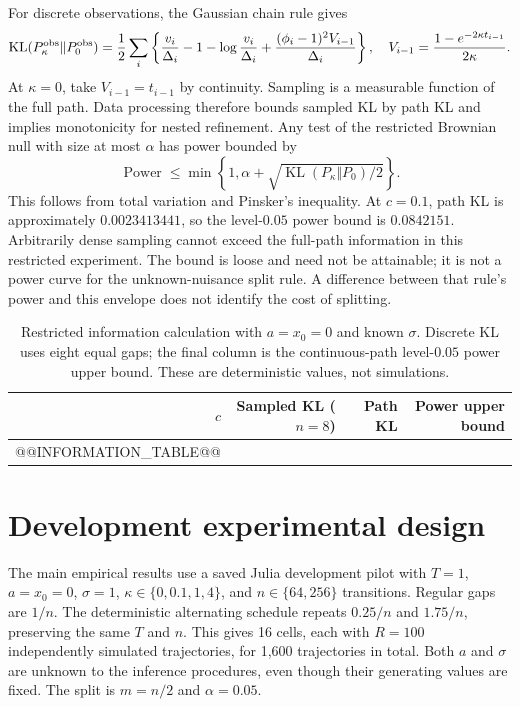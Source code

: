 \documentclass[11pt]{article}
\newcommand{\KL}{\operatorname{KL}}
\begin{document}
For discrete observations, the Gaussian chain rule gives
\begin{equation}
 \KL(P_\kappa^{\rm obs}\Vert P_0^{\rm obs})
 =\frac12\sum_i\left\{
 \frac{v_i}{\Delta_i}-1-\log\frac{v_i}{\Delta_i}
 +\frac{(\phi_i-1)^2 V_{i-1}}{\Delta_i}\right\},
 \quad
 V_{i-1}=\frac{1-e^{-2\kappa t_{i-1}}}{2\kappa}.
 \label{eq:sample-kl}
\end{equation}
At $\kappa=0$, take $V_{i-1}=t_{i-1}$ by continuity.
Sampling is a measurable function of the full path. Data processing therefore
bounds sampled KL by path KL and implies monotonicity for nested refinement.
Any test of the restricted Brownian null with size at most $\alpha$ has power
bounded by
\begin{equation}
 \operatorname{Power}\leq
 \min\left\{1,\alpha+\sqrt{\KL(P_\kappa\Vert P_0)/2}\right\}.
 \label{eq:pinsker}
\end{equation}
This follows from total variation and Pinsker's inequality. At $c=0.1$,
path KL is approximately $0.0023413441$, so the level-$0.05$ power bound is
$0.0842151$. Arbitrarily dense sampling cannot exceed the full-path information
in this restricted experiment. The bound is loose and need not be attainable;
it is not a power curve for the unknown-nuisance split rule. A difference between
that rule's power and this envelope does not identify the cost of splitting.

\begin{table}[!htbp]
\centering\small
\caption{Restricted information calculation with $a=x_0=0$ and known $\sigma$.
Discrete KL uses eight equal gaps; the final column is the continuous-path
level-$0.05$ power upper bound. These are deterministic values, not simulations.}
\label{tab:information}
\begin{tabular}{rrrr}
\toprule
$c$ & Sampled KL ($n=8$) & Path KL & Power upper bound\\
\midrule
@@INFORMATION_TABLE@@
\bottomrule
\end{tabular}
\end{table}

\section{Development experimental design}
The main empirical results use a saved Julia development pilot with
$T=1$, $a=x_0=0$, $\sigma=1$, $\kappa\in\{0,0.1,1,4\}$, and
$n\in\{64,256\}$ transitions. Regular gaps are $1/n$. The deterministic
alternating schedule repeats $0.25/n$ and $1.75/n$, preserving the same $T$
and $n$. This gives 16 cells, each with $R=100$ independently simulated
trajectories, for 1,600 trajectories in total. Both $a$ and $\sigma$ are
unknown to the inference procedures, even though their generating values are
fixed. The split is $m=n/2$ and $\alpha=0.05$.
\end{document}
